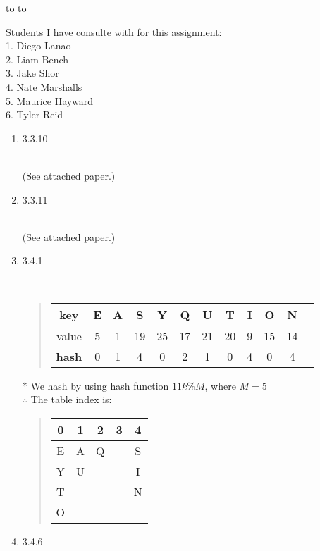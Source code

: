 \documentclass[11pt]{article}
\newcommand{\handout}{
   \renewcommand{\thepage}{H\hnumber-\arabic{page}}
   \noindent
   \begin{center}
      \vbox{
    \hbox to \columnwidth {\sc{\course} --- \prof \hfill}
    \vspace{-2mm}
    \hbox to \columnwidth {\sc due \MakeLowercase{\duedate} \duelocation\hfill {\Huge\color{mdb}H\hnumber.}}
	\vspace{15pt}
	{\Huge\yourname}
      }
   \end{center}
   \vspace*{2mm}
}
\begin{document}
\thispagestyle{empty}
\handout

Students I have consulte with for this assignment:\\
1. Diego Lanao\\
2. Liam Bench\\
3. Jake Shor\\
4. Nate Marshalls\\
5. Maurice Hayward\\
6. Tyler Reid

\begin{enumerate}

\item 3.3.10
\begin{solution}\\
(See attached paper.)
\end{solution}

\item 3.3.11
\begin{solution}\\
(See attached paper.)
\end{solution}

\item 3.4.1

\begin{solution}\\
\begin{quote}
\begin{tabular}{|c|c|c|c|c|c|c|c|c|c|c|c}
\bf key&E&A&S&Y&Q&U&T&I&O&N\\
\hline
value&5&1&19&25&17&21&20&9&15&14\\
\hline
\bf hash&0&1&4&0&2&1&0&4&0&4
\end{tabular}
\end{quote}
* We hash by using hash function $11k\%M$, where $M=5$\\
$\therefore$ The table index is:
\begin{quote}
\begin{tabular}{ccccc}
0&1&2&3&4\\
\hline
E&A&Q&&S\\
Y&U&&&I\\
T&&&&N\\
O&&&&\\
\end{tabular}
\end{quote}

\end{solution}


\item 3.4.6


\end{enumerate}
\end{document}
